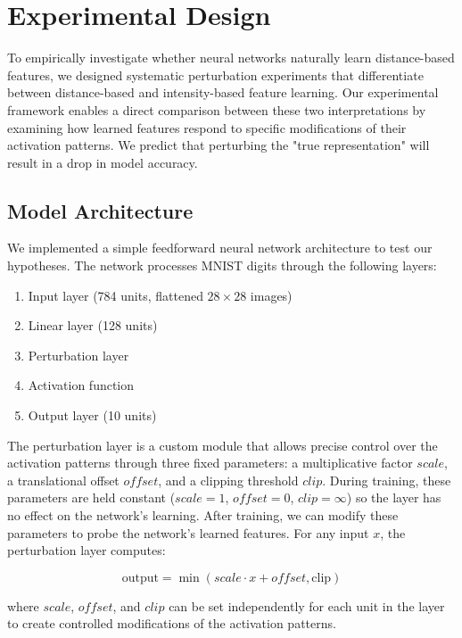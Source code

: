 \section{Experimental Design}

To empirically investigate whether neural networks naturally learn distance-based features, we designed systematic perturbation experiments that differentiate between distance-based and intensity-based feature learning. Our experimental framework enables a direct comparison between these two interpretations by examining how learned features respond to specific modifications of their activation patterns. We predict that perturbing the "true representation" will result in a drop in model accuracy.

\subsection{Model Architecture}
We implemented a simple feedforward neural network architecture to test our hypotheses. The network processes MNIST digits through the following layers:
\begin{enumerate}
    \item Input layer (784 units, flattened $28 \times 28$ images)
    \item Linear layer (128 units)
    \item Perturbation layer
    \item Activation function
    \item Output layer (10 units)
\end{enumerate}

The perturbation layer is a custom module that allows precise control over the activation patterns through three fixed parameters: a multiplicative factor $scale$, a translational offset $offset$, and a clipping threshold $clip$. During training, these parameters are held constant ($scale = 1$, $offset = 0$, $clip = \infty$) so the layer has no effect on the network's learning. After training, we can modify these parameters to probe the network's learned features. For any input $x$, the perturbation layer computes:

\begin{equation}
    \text{output} = \min(scale \cdot x + offset, \text{clip})
\end{equation}

where $scale$, $offset$, and $clip$ can be set independently for each unit in the layer to create controlled modifications of the activation patterns.

